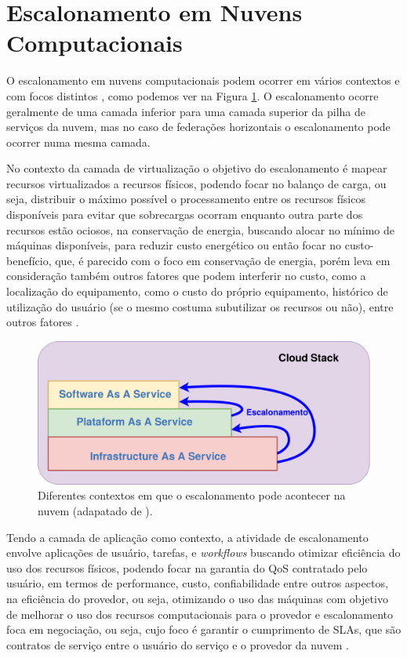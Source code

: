 \section{Escalonamento em Nuvens Computacionais}
O escalonamento em nuvens computacionais podem ocorrer em vários contextos e com focos distintos \cite{Zhan:2015:CCR:2775083.2788397}, como podemos ver na Figura \ref{EscalonamentoStack}. O escalonamento ocorre geralmente de uma camada inferior para uma camada superior da pilha de serviços da nuvem, mas no caso de federações horizontais o escalonamento pode ocorrer numa mesma camada. 

No contexto da camada de virtualização o objetivo do escalonamento é mapear recursos virtualizados a recursos físicos, podendo focar no balanço de carga, ou seja, distribuir o máximo possível o processamento entre os recursos físicos disponíveis para evitar que sobrecargas ocorram enquanto outra parte dos recursos estão ociosos, na conservação de energia, buscando alocar no mínimo de máquinas disponíveis, para reduzir custo energético ou então focar no custo-benefício, que, é parecido com o foco em conservação de energia, porém leva em consideração também outros fatores que podem interferir no custo, como a localização do equipamento, como o custo do próprio equipamento, histórico de utilização do usuário (se o mesmo costuma subutilizar os recursos ou não), entre outros fatores \cite{Zhan:2015:CCR:2775083.2788397}.

\begin{figure}[htbp]
	\centerline{\includegraphics[width=15.0cm]{img/EscalonamentoStack.png}}
	\caption{Diferentes contextos em que o escalonamento pode acontecer na nuvem (adapatado de \cite{Zhan:2015:CCR:2775083.2788397}).}
	\label{EscalonamentoStack}
\end{figure}

Tendo a camada de aplicação como contexto, a atividade de escalonamento envolve aplicações de usuário, tarefas, e \textit{workflows} buscando otimizar eficiência do uso dos recursos físicos, podendo focar na garantia do \acrfull{QoS} contratado pelo usuário, em termos de performance, custo, confiabilidade entre outros aspectos, na eficiência do provedor, ou seja, otimizando o uso das máquinas com objetivo de melhorar o uso dos recursos computacionais para o provedor e escalonamento foca em negociação, ou seja, cujo foco é garantir o cumprimento de \acrfull{SLA}s, que são contratos de serviço entre o usuário do serviço e o provedor da nuvem \cite{Zhan:2015:CCR:2775083.2788397}.

